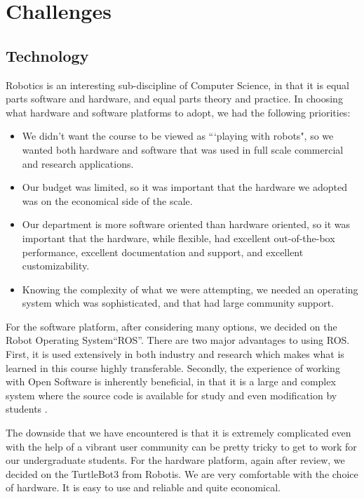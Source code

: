\section{Challenges}

\subsection{Technology} Robotics is an interesting sub-discipline of Computer Science, in that it is equal parts software and hardware, and equal parts theory and practice. In choosing what hardware and software platforms to adopt, we had the following priorities:
\begin{itemize}
    \item We didn't want the course to be viewed as ```playing with robots", so we wanted both hardware and software that was used in full scale commercial and research applications. 
    \item Our budget was limited, so it was important that the hardware we adopted was on the economical side of the scale.
    \item Our department is more software oriented than hardware oriented, so it was important that the hardware, while flexible, had excellent out-of-the-box performance, excellent documentation and support, and excellent customizability.
    \item Knowing the complexity of what we were attempting, we needed an operating system which was sophisticated, and that had large community support.
\end{itemize}
For the software platform, after considering many options, we decided on the Robot Operating System``ROS''\cite{ROS}. There are two major advantages to using ROS. First, it is used extensively in both industry and research which makes what is learned in this course highly transferable. Secondly, the experience of working with Open Software is inherently beneficial, in that it is a large and complex system where the source code is available for study and even modification by students \cite{OpenSource}.

The downside that we have encountered is that it is extremely complicated even with the help of a vibrant user community can be pretty tricky to get to work for our undergraduate students. For the hardware platform, again after review, we decided on the TurtleBot3\cite{Turtle} from Robotis. We are very comfortable with the choice of hardware. It is easy to use and reliable and quite economical.

